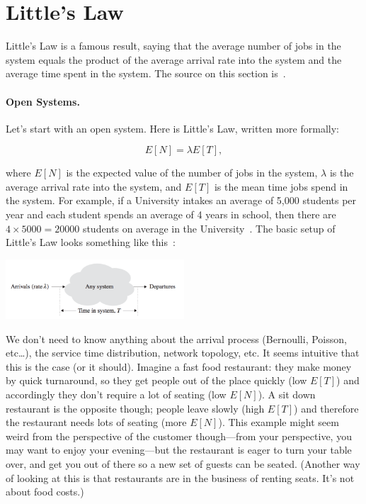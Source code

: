 \documentclass[a4paper]{report}
\begin{document}
\section*{Little's Law}
Little's Law is a famous result, saying that the average number of jobs in the system equals the product of the average arrival rate into the system and the average time spent in the system. The source on this section is~\cite{pmd}.

\paragraph{Open Systems.} Let's start with an open system. Here is Little's Law, written more formally:

\[
	E[N] = \lambda E[T],
\]

where $E[N]$ is the expected value of the number of jobs in the system, $\lambda$ is the average arrival rate into the system, and $E[T]$ is the mean time jobs spend in the system. For example, if a University intakes an average of 5,000 students per year and each student spends an average of 4 years in school, then there are $4 \times 5000=20000$ students on average in the University~\cite{sigman-little-law}. The basic setup of Little's Law looks something like this~\cite{pmd}:

\begin{center}
	\includegraphics[width=0.5\textwidth]{images/littleslaw.png}
\end{center}

We don't need to know anything about the arrival process (Bernoulli, Poisson, etc\ldots), the service time distribution, network topology, etc. It seems intuitive that this is the case (or it should). Imagine a fast food restaurant: they make money by quick turnaround, so they get people out of the place quickly (low $E[T]$) and accordingly they don't require a lot of seating (low $E[N]$). A sit down restaurant is the opposite though; people leave slowly (high $E[T]$) and therefore the restaurant needs lots of seating (more $E[N]$). This example might seem weird from the perspective of the customer though---from your perspective, you may want to enjoy your evening---but the restaurant is eager to turn your table over, and get you out of there so a new set of guests can be seated. (Another way of looking at this is that restaurants are in the business of renting seats. It's not about food costs.)
\end{document}
